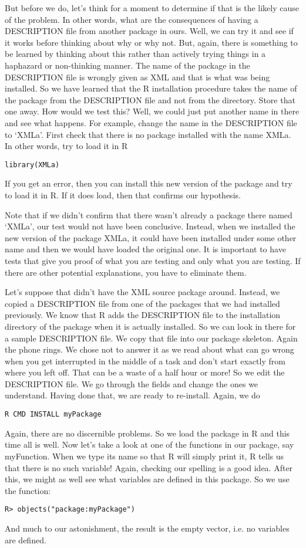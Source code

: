 But before we do, let's think for a moment to determine if that is the
likely cause of the problem.  In other words, what are the
consequences of having a DESCRIPTION file from another package in
ours.  Well, we can try it and see if it works before thinking about
why or why not.  But, again, there is something to be learned by
thinking about this rather than actively trying things
in a haphazard or non-thinking manner.
The name of the package in the DESCRIPTION file is wrongly
given as XML and that is what was being installed.
So we have learned that the R installation procedure
takes the name of the package from the DESCRIPTION file
and not from the directory. Store that one away.
How would we test this? Well, we could just put another
name in there and see what happens.
For example, change the name in the DESCRIPTION file to `XMLa'.
First check that there is no package installed with the name
XMLa. In other words, try to load it in R
\begin{verbatim}
library(XMLa)
\end{verbatim}
If you get an error, then you can install this new
version of the package and try to load it in R.
If it does load, then that confirms our hypothesis.

Note that if we didn't confirm that there wasn't already a package
there named `XMLa', our test would not have been conclusive. Instead,
when we installed the new version of the package XMLa, it could have
been installed under some other name and then we would have loaded the
original one.  It is important to have tests that give you proof of
what you are testing and only what you are testing.  If there are
other potential explanations, you have to eliminate them.


Let's suppose that didn't have the XML source package around. Instead,
we copied a DESCRIPTION file from one of the packages that we had
installed previously.  We know that R adds the DESCRIPTION file to the
installation directory of the package when it is actually installed.
So we can look in there for a sample DESCRIPTION file.  We copy that
file into our package skeleton.  Again the phone rings.  We chose not
to answer it as we read about what can go wrong when you get
interrupted in the middle of a task and don't start exactly from where
you left off. That can be a waste of a half hour or more!  So we edit
the DESCRIPTION file.  We go through the fields and change the ones we
understand.  Having done that, we are ready to re-install.
Again, we do
\begin{verbatim}
R CMD INSTALL myPackage
\end{verbatim}
Again, there are no discernible problems.
So we load the package in R and this time all is well.
Now let's take a look at one of the functions
in our package, say myFunction.
When we type its name so that R will simply print it,
R tells us that there is no such variable!
Again, checking our spelling is a good idea.
After this, we might as well see what variables
are defined in this package.
So we use the  function:
\begin{verbatim}
R> objects("package:myPackage")
\end{verbatim}
And much to our astonishment, the result
is the empty vector, i.e. no variables
are defined.  

